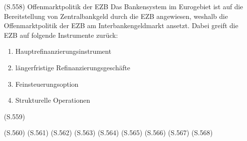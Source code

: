 \documentclass[
      onecolumn,
      a4paper,
      abstracton,
      parskip=half
      ,final
      ]{scrartcl}
\begin{document}
(S.558)
Offenmarktpolitik der EZB
Das Bankensystem im Eurogebiet ist auf die Bereitstellung von Zentralbankgeld durch die EZB angewiesen, weshalb die Offenmarktpolitik der EZB am Interbankengeldmarkt ansetzt. Dabei greift die EZB auf folgende Instrumente zur{\"u}ck:
\begin{enumerate}
  \item{Hauptrefinanzierungsinstrument}
  \item{l{\"a}ngerfristige Refinanzierungsgesch{\"a}fte}
  \item{Feinsteuerungsoption}
  \item{Strukturelle Operationen}
  \end{enumerate}





  
(S.559)

(S.560)
(S.561)
(S.562)
(S.563)
(S.564)
(S.565)
(S.566)
(S.567)
(S.568)
\end{document}
